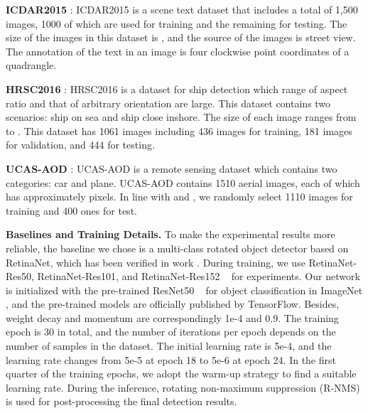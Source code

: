 \documentclass[10pt,twocolumn,letterpaper]{article}
\begin{document}
\textbf{ICDAR2015} \cite{karatzas2015icdar}: ICDAR2015 is a scene text dataset that includes a total of 1,500 images, 1000 of which are used for training and the remaining for testing. The size of the images in this dataset is , and the source of the images is street view. The annotation of the text in an image is four clockwise point coordinates of a quadrangle.

\textbf{HRSC2016} \cite{R19_zk2017high}: HRSC2016 is a dataset for ship detection which range of aspect ratio and that of arbitrary orientation are large. This dataset contains two scenarios: ship on sea and ship close inshore. The size of each image ranges from  to . This dataset has 1061 images including 436 images for training, 181 images for validation, and 444 for testing.



\textbf{UCAS-AOD} \cite{zhu2015orientation}: UCAS-AOD is a remote sensing dataset which contains two categories: car and plane. UCAS-AOD contains 1510 aerial images, each of which has approximately  pixels. In line with \cite{R29_ding2018learning} and \cite{R27_azimi2018towards}, we randomly select 1110 images for training and 400 ones for test.

\textbf{Baselines and Training Details.}
To make the experimental results more reliable, the baseline we chose is a multi-class rotated object detector based on RetinaNet, which has been verified in work \cite{R20_Yang2019R3Det}. During training, we use RetinaNet-Res50, RetinaNet-Res101, and RetinaNet-Res152 ~\cite{R25_Lin2017Focal} for experiments. Our network is initialized with the pre-trained ResNet50 ~\cite{he2016deep} for object classification in ImageNet \cite{deng2009imagenet}, and the pre-trained models are officially published by TensorFlow. Besides, weight decay and momentum are correspondingly 1e-4 and 0.9. The training epoch is 30 in total, and the number of iterations per epoch depends on the number of samples in the dataset. The initial learning rate is 5e-4, and the learning rate changes from 5e-5 at epoch 18 to 5e-6 at epoch 24. In the first quarter of the training epochs, we adopt the warm-up strategy to find a suitable learning rate. During the inference, rotating non-maximum suppression (R-NMS) is used for post-processing the final detection results.
\end{document}
